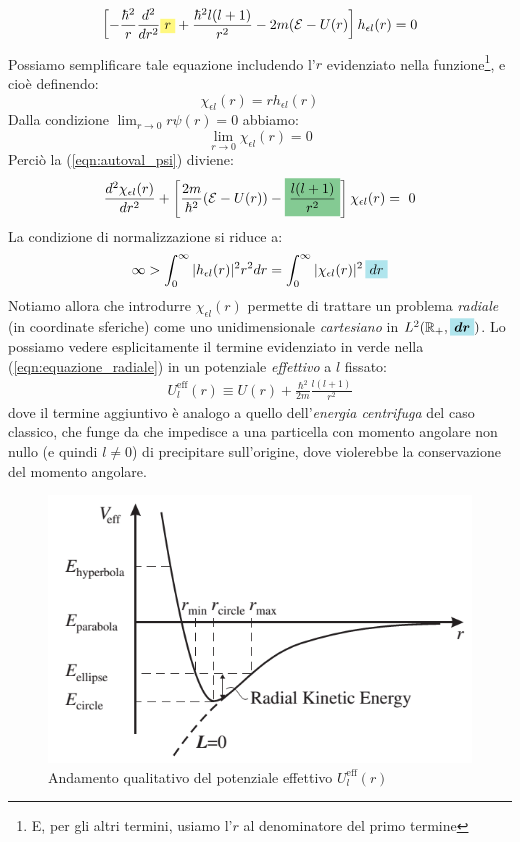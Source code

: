 \documentclass[../../FisicaTeorica.tex]{subfiles}
\begin{document}
\begin{align}
\left[ - \frac{\hbar^2}{r}\frac{d^2}{dr^2} \hlc{Yellow}{r} + \frac{\hbar^2 l (l+1)}{r^2}-2m(\mathcal{E}-U(r)\right] h_{\epsilon l}(r) = 0
\label{eqn:autoval_psi}
\end{align}
Possiamo semplificare tale equazione includendo l'$r$ evidenziato nella funzione\footnote{E, per gli altri termini, usiamo l'$r$ al denominatore del primo termine}, e cioè definendo:
\[
\chi_{\epsilon l}(r) = rh_{\epsilon l}(r)
\]
Dalla condizione $\lim_{r\to 0}r \psi(r) = 0$ abbiamo:
\[
\lim_{r\to 0} 
\chi_{\epsilon l }(r) = 0
\]
Perciò la (\ref{eqn:autoval_psi}) diviene:
\begin{align}
\frac{d^2 \chi_{\epsilon l}(r)}{dr^2} + \left[
\frac{2m}{\hbar^2}(\mathcal{E}-U(r)) - \hlc{ForestGreen}{\frac{l(l+1)}{r^2}}\right] \chi_{\epsilon l}(r) =\ 0
\label{eqn:equazione_radiale}
\end{align}
La condizione di normalizzazione si riduce a:
\[
\infty > \int_0^\infty |h_{\epsilon l}(r)|^2 r^2 dr =\int_0^\infty |\chi_{\epsilon l}(r)|^2\,\hlc{SkyBlue}{dr}
\]
Notiamo allora che introdurre $\chi_{\epsilon l}(r)$ permette di trattare un problema \textit{radiale} (in coordinate sferiche) come uno unidimensionale \textit{cartesiano} in $L^2(\bb{R}_+, \hlc{SkyBlue}{\bm{dr}})$. Lo possiamo vedere esplicitamente  il termine evidenziato in verde nella (\ref{eqn:equazione_radiale}) in un potenziale \textit{effettivo} a $l$ fissato:
\begin{align*}
U^{\mathrm{eff}}_l(r) \equiv U(r) + \frac{\hbar^2}{2m}\frac{l(l+1)}{r^2}
\end{align*}
dove il termine aggiuntivo è analogo a quello dell'\textit{energia centrifuga} del caso classico, che funge da  che impedisce a una particella con momento angolare non nullo (e quindi $l\neq 0$) di precipitare sull'origine, dove violerebbe la conservazione del momento angolare.
\begin{figure}[H]
\centering
\includegraphics[scale=0.5]{Immagini/3_12/image001.png}
\caption{Andamento qualitativo del potenziale effettivo $U^{\mathrm{eff}}_l(r)$}
\end{figure}
\end{document}
